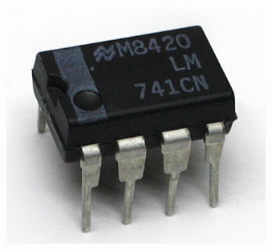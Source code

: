\begin{frame}
\begin{columns}[c]
\begin{figure}[H]
\begin{center}
    \end{center}
    \end{figure}
    \begin{figure}[H]
    \begin{center}
            \includegraphics[scale=0.2]{./img/misc/opv_photo.jpg}
    \end{center}
    \end{figure}
    \end{columns}    
\end{frame}

